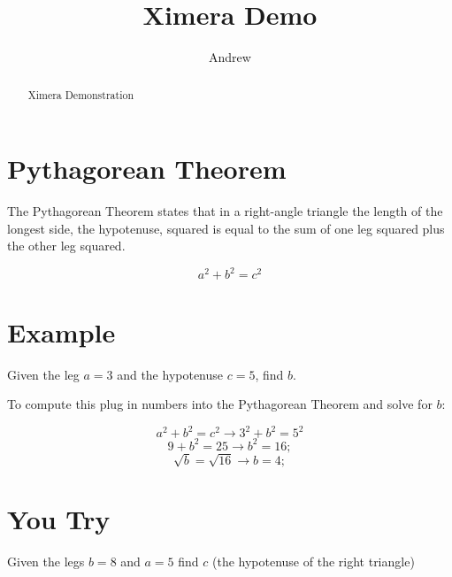\documentclass{ximera}
\title{Ximera Demo}
\author{Andrew}
\begin{document}
\begin{abstract}
    Ximera Demonstration
\end{abstract}


\maketitle

\section{Pythagorean Theorem} The Pythagorean Theorem states that in a right-angle triangle the length of the longest side, the hypotenuse, squared is equal to the sum of one leg squared plus the other leg squared.

\[
{a^2 + b^2 = c^2}
\]

\section{Example} Given the leg $a = 3$ and the hypotenuse $c = 5$, find $b$.

\begin{center}
    
\end{center}

To compute this plug in numbers into the Pythagorean Theorem and solve for $b$:

\[
    a^2 + b^2 = c^2 \rightarrow{3^2 + b^2 = 5^2}
\]
\[
    9 + b^2 = 25 \rightarrow{b^2 = 16};
 \]
\[
    \sqrt{ b } = \sqrt{ 16 }\rightarrow{b = 4};
\]

\section{You Try} Given the legs $b=8$ and $a=5$ find $c$ (the hypotenuse of the right triangle)

\begin{center}
\end{center}
\end{document}
